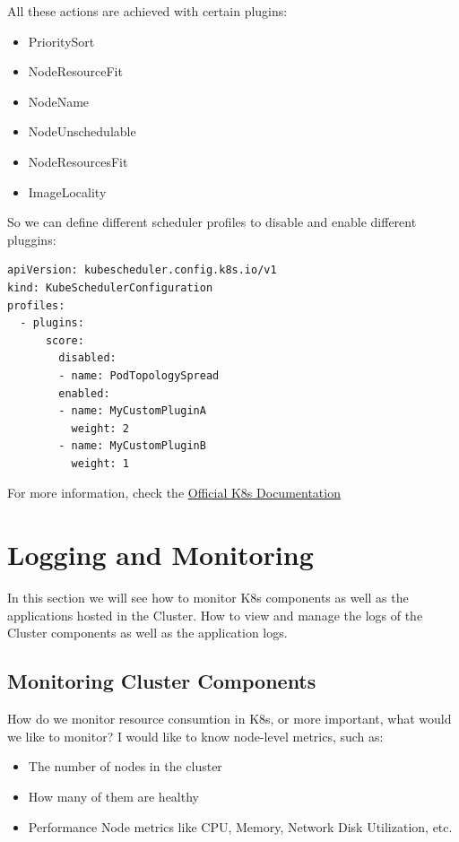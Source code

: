 \documentclass{article}
\newenvironment{codetemplate}[1][]{%
  \mybasecolorbox[#1]
  \itshape
}{%
  \endmybasecolorbox
}
\begin{document}
All these actions are achieved with certain plugins:
\begin{itemize}
    \item PrioritySort
    \item NodeResourceFit
    \item NodeName
    \item NodeUnschedulable
    \item NodeResourcesFit
    \item ImageLocality
\end{itemize}

So we can define different scheduler profiles to disable and enable different pluggins:

\begin{codetemplate}{}
\begin{verbatim}
apiVersion: kubescheduler.config.k8s.io/v1
kind: KubeSchedulerConfiguration
profiles:
  - plugins:
      score:
        disabled:
        - name: PodTopologySpread
        enabled:
        - name: MyCustomPluginA
          weight: 2
        - name: MyCustomPluginB
          weight: 1
\end{verbatim}
\end{codetemplate}

For more information, check the \href{https://kubernetes.io/docs/reference/scheduling/config/}{Official K8s Documentation}


\newpage
\section{Logging and Monitoring}

In this section we will see how to monitor K8s components as well as the applications hosted in the Cluster. How to view and manage the logs of the Cluster components as well as the application logs.

\subsection{Monitoring Cluster Components}

How do we monitor resource consumtion in K8s, or more important, what would we like to monitor? I would like to know node-level metrics, such as:
\begin{itemize}
    \item The number of nodes in the cluster
    \item How many of them are healthy
    \item Performance Node metrics like CPU, Memory, Network Disk Utilization, etc.
\end{itemize}
\end{document}
